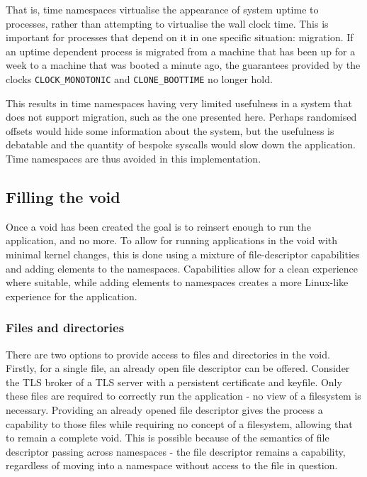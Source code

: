 \documentclass[sigplan]{acmart}
\begin{document}

That is, time namespaces virtualise the appearance of system uptime to processes, rather than attempting to virtualise the wall clock time. This is important for processes that depend on it in one specific situation: migration. If an uptime dependent process is migrated from a machine that has been up for a week to a machine that was booted a minute ago, the guarantees provided by the clocks \texttt{CLOCK\_MONOTONIC} and \texttt{CLONE\_BOOTTIME} no longer hold.

This results in time namespaces having very limited usefulness in a system that does not support migration, such as the one presented here. Perhaps randomised offsets would hide some information about the system, but the usefulness is debatable and the quantity of bespoke syscalls would slow down the application. Time namespaces are thus avoided in this implementation.

\subsection{Filling the void}

Once a void has been created the goal is to reinsert enough to run the application, and no more. To allow for running applications in the void with minimal kernel changes, this is done using a mixture of file-descriptor capabilities and adding elements to the namespaces. Capabilities allow for a clean experience where suitable, while adding elements to namespaces creates a more Linux-like experience for the application.

\subsubsection{Files and directories} There are two options to provide access to files and directories in the void. Firstly, for a single file, an already open file descriptor can be offered. Consider the TLS broker of a TLS server with a persistent certificate and keyfile. Only these files are required to correctly run the application - no view of a filesystem is necessary. Providing an already opened file descriptor gives the process a capability to those files while requiring no concept of a filesystem, allowing that to remain a complete void. This is possible because of the semantics of file descriptor passing across namespaces - the file descriptor remains a capability, regardless of moving into a namespace without access to the file in question.
\end{document}
